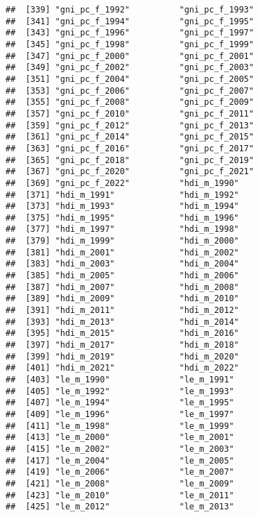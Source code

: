 \documentclass[
]{article}
\begin{document}
\begin{verbatim}
##  [339] "gni_pc_f_1992"          "gni_pc_f_1993"         
##  [341] "gni_pc_f_1994"          "gni_pc_f_1995"         
##  [343] "gni_pc_f_1996"          "gni_pc_f_1997"         
##  [345] "gni_pc_f_1998"          "gni_pc_f_1999"         
##  [347] "gni_pc_f_2000"          "gni_pc_f_2001"         
##  [349] "gni_pc_f_2002"          "gni_pc_f_2003"         
##  [351] "gni_pc_f_2004"          "gni_pc_f_2005"         
##  [353] "gni_pc_f_2006"          "gni_pc_f_2007"         
##  [355] "gni_pc_f_2008"          "gni_pc_f_2009"         
##  [357] "gni_pc_f_2010"          "gni_pc_f_2011"         
##  [359] "gni_pc_f_2012"          "gni_pc_f_2013"         
##  [361] "gni_pc_f_2014"          "gni_pc_f_2015"         
##  [363] "gni_pc_f_2016"          "gni_pc_f_2017"         
##  [365] "gni_pc_f_2018"          "gni_pc_f_2019"         
##  [367] "gni_pc_f_2020"          "gni_pc_f_2021"         
##  [369] "gni_pc_f_2022"          "hdi_m_1990"            
##  [371] "hdi_m_1991"             "hdi_m_1992"            
##  [373] "hdi_m_1993"             "hdi_m_1994"            
##  [375] "hdi_m_1995"             "hdi_m_1996"            
##  [377] "hdi_m_1997"             "hdi_m_1998"            
##  [379] "hdi_m_1999"             "hdi_m_2000"            
##  [381] "hdi_m_2001"             "hdi_m_2002"            
##  [383] "hdi_m_2003"             "hdi_m_2004"            
##  [385] "hdi_m_2005"             "hdi_m_2006"            
##  [387] "hdi_m_2007"             "hdi_m_2008"            
##  [389] "hdi_m_2009"             "hdi_m_2010"            
##  [391] "hdi_m_2011"             "hdi_m_2012"            
##  [393] "hdi_m_2013"             "hdi_m_2014"            
##  [395] "hdi_m_2015"             "hdi_m_2016"            
##  [397] "hdi_m_2017"             "hdi_m_2018"            
##  [399] "hdi_m_2019"             "hdi_m_2020"            
##  [401] "hdi_m_2021"             "hdi_m_2022"            
##  [403] "le_m_1990"              "le_m_1991"             
##  [405] "le_m_1992"              "le_m_1993"             
##  [407] "le_m_1994"              "le_m_1995"             
##  [409] "le_m_1996"              "le_m_1997"             
##  [411] "le_m_1998"              "le_m_1999"             
##  [413] "le_m_2000"              "le_m_2001"             
##  [415] "le_m_2002"              "le_m_2003"             
##  [417] "le_m_2004"              "le_m_2005"             
##  [419] "le_m_2006"              "le_m_2007"             
##  [421] "le_m_2008"              "le_m_2009"             
##  [423] "le_m_2010"              "le_m_2011"             
##  [425] "le_m_2012"              "le_m_2013"             

\end{verbatim}
\end{document}
